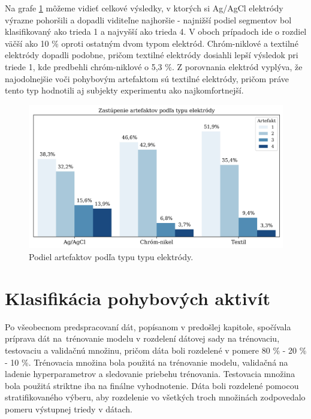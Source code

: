 Na grafe \ref{fig:electrode_stats_2} môžeme vidieť celkové výsledky, v ktorých si Ag/AgCl elektródy výrazne pohoršili a dopadli viditeľne najhoršie - najnižší podiel segmentov bol klasifikovaný ako trieda 1 a najvyšší ako trieda 4. V oboch prípadoch ide o rozdiel väčší ako 10 \% oproti ostatným dvom typom elektród. Chróm-niklové a textilné elektródy dopadli podobne, pričom textilné elektródy dosiahli lepší výsledok pri triede 1, kde predbehli chróm-niklové o 5,3 \%. Z porovnania elektród vyplýva, že najodolnejšie voči pohybovým artefaktom sú textilné elektródy, pričom práve tento typ hodnotili aj subjekty experimentu ako najkomfortnejší.

\begin{figure}[H]
    \centering    
    \includegraphics[scale=0.07]{img/electrode_stats_2.jpg}
    \caption{Podiel artefaktov podľa typu typu elektródy.}
    \label{fig:electrode_stats_2}
\end{figure}


\section{Klasifikácia pohybových aktivít}

Po všeobecnom predspracovaní dát, popísanom v predošlej kapitole, spočívala príprava dát na~trénovanie modelu v rozdelení dátovej sady na trénovaciu, testovaciu a validačnú množinu, pričom dáta boli rozdelené v pomere 80 \% -  20 \% - 10 \%. Trénovacia množina bola použitá na trénovanie modelu, validačná na ladenie hyperparametrov a sledovanie priebehu trénovania. Testovacia množina bola použitá striktne iba na finálne vyhodnotenie. Dáta boli rozdelené pomocou stratifikovaného výberu, aby rozdelenie vo všetkých troch množinách zodpovedalo pomeru výstupnej triedy v dátach.

